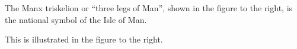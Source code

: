 \documentclass{article}
\begin{document}
\begin{example}The Manx triskelion or ``three legs of Man'', shown in the figure to the right, is the national symbol of the Isle of Man.
\end{example}

\begin{example}This is illustrated in the figure to the right.
\end{example}
\end{document}
